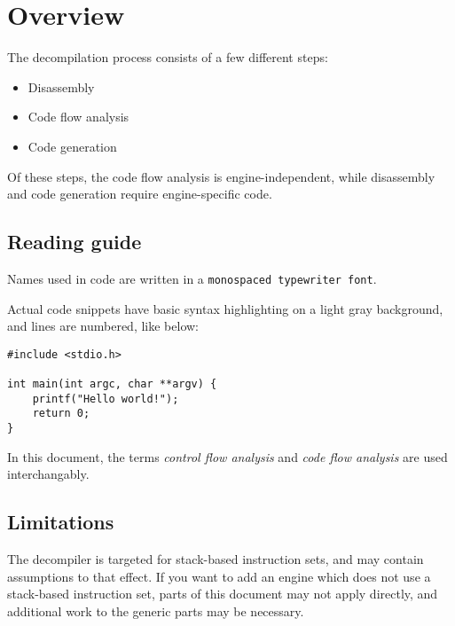 \section{Overview}
The decompilation process consists of a few different steps:

\begin{itemize}
\item Disassembly
\item Code flow analysis
\item Code generation
\end{itemize}

Of these steps, the code flow analysis is engine-independent, while disassembly and code generation require engine-specific code.

\subsection{Reading guide}
Names used in code are written in a \verb+monospaced typewriter font+.

Actual code snippets have basic syntax highlighting on a light gray background, and lines are numbered, like below:

\begin{C++}
\begin{lstlisting}
#include <stdio.h>

int main(int argc, char **argv) {
	printf("Hello world!");
	return 0;
}
\end{lstlisting}
\end{C++}

In this document, the terms \emph{control flow analysis} and \emph{code flow analysis} are used interchangably.

\subsection{Limitations}
The decompiler is targeted for stack-based instruction sets, and may contain assumptions to that effect. If you want to add an engine which does not use a stack-based instruction set, parts of this document may not apply directly, and additional work to the generic parts may be necessary.
